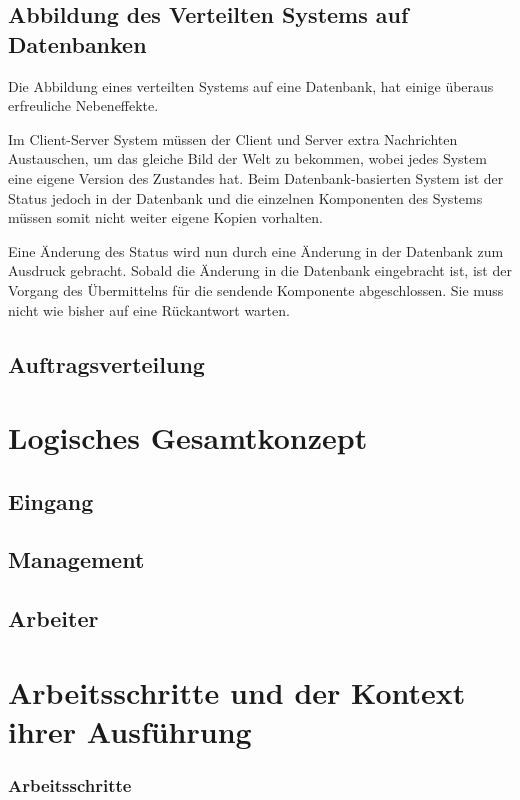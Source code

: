 \subsection{Abbildung des Verteilten Systems auf Datenbanken}

Die Abbildung eines verteilten Systems auf eine Datenbank,
hat einige überaus erfreuliche Nebeneffekte.

Im Client-Server System müssen der Client und Server extra Nachrichten Austauschen, um das gleiche Bild der Welt zu bekommen, wobei jedes System eine eigene Version des Zustandes hat.
Beim Datenbank-basierten System ist der Status jedoch in der Datenbank und
die einzelnen Komponenten des Systems müssen somit nicht weiter eigene Kopien vorhalten.

Eine Änderung des Status wird nun durch eine Änderung in der Datenbank zum Ausdruck gebracht.
Sobald die Änderung in die Datenbank eingebracht ist,
ist der Vorgang des Übermittelns für die sendende Komponente abgeschlossen.
Sie muss nicht wie bisher auf eine Rückantwort warten.

\subsection{Auftragsverteilung}

\section{Logisches Gesamtkonzept}
\subsection{Eingang}
\subsection{Management}
\subsection{Arbeiter}

\section{Arbeitsschritte und der Kontext ihrer Ausführung}

\subsubsection{Arbeitsschritte}


